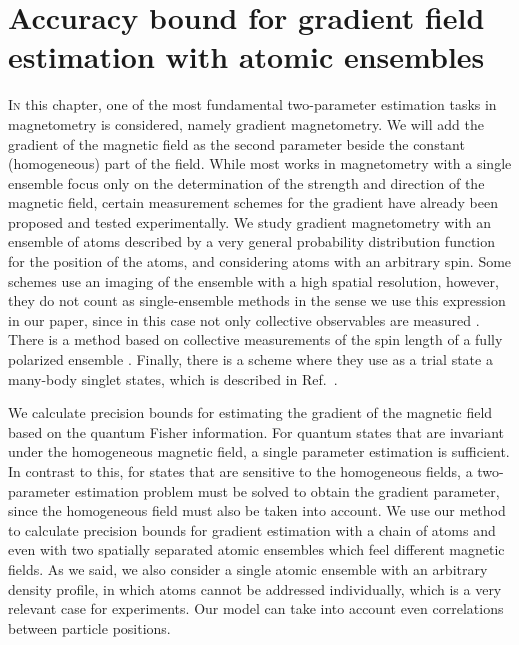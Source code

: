 \section[Metrology of the gradient magnetic field]
{Accuracy bound for gradient field estimation with atomic ensembles}
\label{sec:gm}



\lettrine[lines=2, findent=3pt, nindent=0pt]{I}{n} this chapter, one of the most fundamental two-parameter estimation tasks in magnetometry is considered, namely gradient magnetometry.
We will add the gradient of the magnetic field as the second parameter beside the constant (homogeneous) part of the field.
While most works in magnetometry with a single ensemble focus only on the determination of the strength and direction of the magnetic field, certain measurement schemes for the gradient have already been proposed and tested experimentally.
We study gradient magnetometry with an ensemble of atoms described by a very general probability distribution function for the position of the atoms, and considering atoms with an arbitrary spin.
Some schemes use an imaging of the ensemble with a high spatial resolution, however, they do not count as single-ensemble methods in the sense we use this expression in our paper, since in this case not only collective observables are measured  \cite{Vengalattore2007,Zhou2010,Koschorreck2011}.
There is a method based on collective measurements of the spin length of a fully polarized ensemble \cite{Behbood2013}.
Finally, there is a scheme where they use as a trial state a many-body singlet states, which is described in Ref.~\cite{Urizar-Lanz2013}.

We calculate precision bounds for estimating the gradient of the magnetic field based on the quantum Fisher information.
For quantum states that are invariant under the homogeneous magnetic field, a single parameter estimation is sufficient.
In contrast to this, for states that are sensitive to the homogeneous fields, a two-parameter estimation problem must be solved to obtain the gradient parameter, since the homogeneous field must also be taken into account.
We use our method to calculate precision bounds for gradient estimation with a chain of atoms and even with two spatially separated atomic ensembles which feel different magnetic fields.
As we said, we also consider a single atomic ensemble with an arbitrary density profile, in which atoms cannot be addressed individually, which is a very relevant case for experiments.
Our model can take into account even correlations between particle positions.

